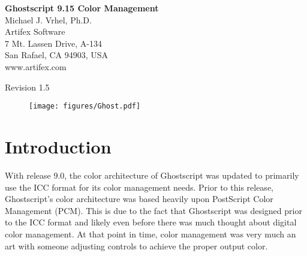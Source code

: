 \documentclass[12pt,notitlepage]{article}
\begin{document}
\begin{titlepage}

\begin{center}{\huge \bf Ghostscript 9.15 Color Management\\} \vspace{0.5in} {\Large Michael J.
Vrhel, Ph.D.\\} {\Large Artifex Software\\} {\Large 7 Mt. Lassen Drive, A-134\\} {\Large San Rafael, CA 94903, USA\\}
{\Large www.artifex.com\\}
\end{center}
\vspace*{0.5in}
\begin{abstract}
This document provides information about the color architecture in Ghostscript 9.15. The document is suitable for users who wish to
obtain accurate color with their output device as well as for developers who wish to customize Ghostscript to achieve a higher
level of control and/or interface with a different color management module.
\end{abstract}
\begin{center}
\vspace*{0.25in}
Revision 1.5
\vspace*{0.25in}
\capstartfalse
\begin{figure}[h]
    \begin{center}
\texttt{[image: figures/Ghost.pdf]}
    \end{center}
\end{figure}
\capstarttrue

\end{center}

\end{titlepage}

\renewcommand{\baselinestretch}{1.67}\normalsize

\clearpage

\singlespace

\section{Introduction}

With release 9.0, the color architecture of Ghostscript was updated to primarily use the ICC\cite{ICC} format for its color management needs.  Prior to this release, Ghostscript's color architecture was based heavily upon PostScript\cite{PS} Color Management (PCM).  This is due to the fact that Ghostscript was designed prior to the ICC format and likely even before there was much thought about digital color management.  At that point in time, color management was very much an art with someone adjusting controls to achieve the proper output color.
\end{document}
